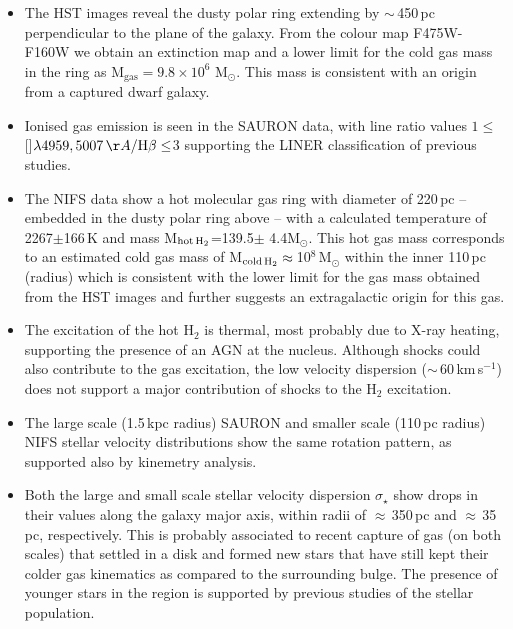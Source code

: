 \documentclass[fleqn,usenatbib]{mnras}
\begin{document}
\begin{itemize}
    \item The HST images reveal the dusty polar ring extending by $\sim$\,450\,pc perpendicular to the plane of the galaxy. From the colour map F475W-F160W we obtain an extinction map and a lower limit for the cold gas mass in the ring as M$_{\text{gas}} = 9.8 \times 10^{6}$ M$_\odot$. This mass is consistent with an origin from a captured dwarf galaxy. 
    
    \item Ionised gas emission is seen in the SAURON data, with line ratio values $1\le$[]$\lambda4959,5007\,\AA/\mathrm{H\beta}\le$3 supporting the LINER classification of previous studies.
    
    \item The NIFS data show a hot molecular gas ring with diameter of 220\,pc – embedded in the dusty polar ring above – with a calculated temperature of 2267$\pm$166\,K and mass M$_{\rm {hot\,H_2}}$=139.5$\pm$ 4.4M$_\odot$. This hot gas mass corresponds to an estimated cold gas mass of M$_{\rm{cold\,H_2}}\approx$\,10$^8$\,M$_\odot$ within the inner 110\,pc (radius) which is consistent with the lower limit for the gas mass obtained from the HST images and further suggests an extragalactic origin for this gas.
    
    \item The excitation of the hot H$_2$ is thermal, most probably due to X-ray heating, supporting the presence of an AGN at the nucleus. Although shocks could also contribute to the gas excitation, the low velocity dispersion ($\sim$\,60\,km\,s$^{-1}$) does not support a major contribution of shocks to the H$_2$ excitation.
    

    \item The large scale (1.5\,kpc radius) SAURON and smaller scale  (110\,pc radius) NIFS stellar velocity distributions show the same rotation pattern, as supported also by kinemetry analysis.
    
    \item Both the large and small scale stellar velocity dispersion $\sigma_\star$ show drops in their values along the galaxy major axis, within radii of $\approx$\,350\,pc and $\approx$\,35\,pc, respectively. This is probably associated to recent capture of gas (on both scales) that settled in a disk and formed new stars that have still kept their colder gas kinematics as compared to the surrounding bulge. The presence of younger stars in the region is supported by previous studies of the stellar population.


\end{itemize}
\end{document}
